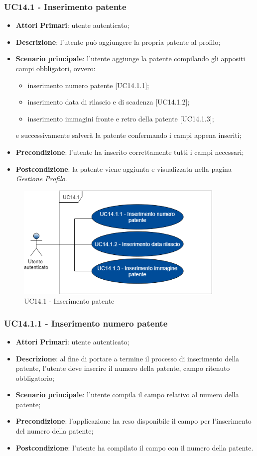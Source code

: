 \subsubsection{UC14.1 - Inserimento patente}
\begin{itemize}
	\item \textbf{Attori Primari}: utente autenticato;
	\item \textbf{Descrizione}: l'utente può aggiungere la propria patente al profilo;
	\item \textbf{Scenario principale}: l'utente aggiunge la patente compilando gli appositi campi obbligatori, ovvero:
	\begin{itemize}
		\item inserimento numero patente [UC14.1.1];
		\item inserimento data di rilascio e di scadenza [UC14.1.2];
		\item inserimento immagini fronte e retro della patente [UC14.1.3];
	\end{itemize}
	e successivamente salverà la patente confermando i campi appena inseriti;	 
	\item \textbf{Precondizione}: l'utente ha inserito correttamente tutti i campi necessari;
	\item \textbf{Postcondizione}: la patente viene aggiunta e visualizzata nella pagina \textit{Gestione Profilo}.
\end{itemize}
\begin{figure}[h]
	\includegraphics[width=10cm]{res/images/UC14-Patente.png}
	\centering
	\caption{UC14.1 - Inserimento patente}
\end{figure}
\newpage
\subsubsection{UC14.1.1 - Inserimento numero patente}
\begin{itemize}
	\item \textbf{Attori Primari}: utente autenticato;
	\item \textbf{Descrizione}: al fine di portare a termine il processo di inserimento della patente, l'utente deve inserire il numero della patente, campo ritenuto obbligatorio; 
	\item \textbf{Scenario principale}: l'utente compila il campo relativo al numero della patente;	
	\item \textbf{Precondizione}: l'applicazione ha reso disponibile il campo per l'inserimento del numero della patente;
	\item \textbf{Postcondizione}: l'utente ha compilato il campo con il numero della patente.
\end{itemize}
